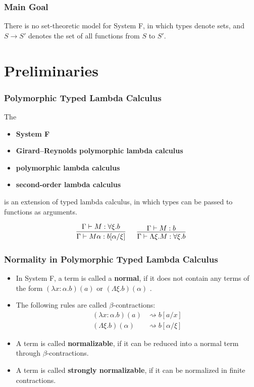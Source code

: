 \begin{frame}[t,plain]
\titlepage
\end{frame}

\begin{frame}[fragile]
    \frametitle{Main Goal}
  
    There is no set-theoretic model for System F, in which types denote sets, and $S \rightarrow S'$ denotes the set of all functions from $S$ to $S'$.
\end{frame}

\section{Preliminaries}

\begin{frame}[fragile]
    \frametitle{Polymorphic Typed Lambda Calculus}
  
    The
    \begin{itemize}
        \item \textbf{System F}
        \item \textbf{Girard--Reynolds polymorphic lambda calculus}
        \item \textbf{polymorphic lambda calculus}
        \item \textbf{second-order lambda calculus}
    \end{itemize}
    is an extension of typed lambda calculus, in which types can be passed to functions as arguments.
  
    $$
    \begin{matrix}
    \infer{\Gamma \vdash M\alpha : b[\alpha/\xi]}{\Gamma \vdash M : \forall\xi.b}
    \ &\ 
    \infer{\Gamma \vdash \Lambda\xi. M : \forall\xi.b}{\Gamma \vdash M : b}
    \end{matrix}
    $$
\end{frame}

\begin{frame}[fragile]
    \frametitle{Normality in Polymorphic Typed Lambda Calculus}
  
    \begin{itemize}
        \item In System F, a term is called a \textbf{normal}, if it does not contain any terms of the form $(\lambda x: \alpha. b)(a)$ or $(\Lambda \xi. b)(\alpha)$  \cite{capretta_valentini_1999}.
        \item The following rules are called $\beta$-contractions:
        \begin{align*}
            (\lambda x: \alpha. b)(a) &\rightsquigarrow b [a/x] \\
            (\Lambda \xi. b)(\alpha) &\rightsquigarrow b [\alpha / \xi]
        \end{align*}
        \item A term is called \textbf{normalizable}, if it can be reduced into a normal term through $\beta$-contractions.
        \item A term is called \textbf{strongly normalizable}, if it can be normalized in finite contractions.
    \end{itemize}
\end{frame}


